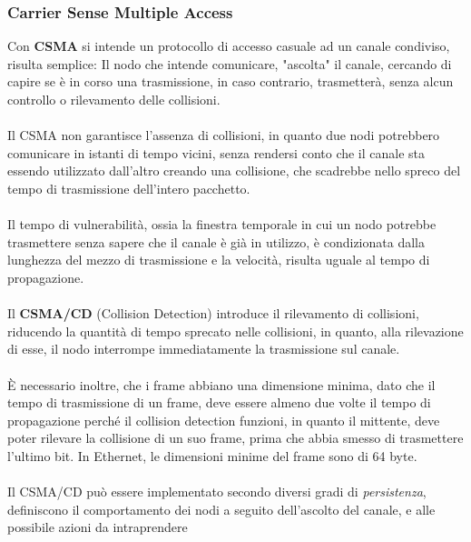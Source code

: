 \documentclass[12pt, letterpaper]{article}
\newcommand{\acc}{\\\hphantom{}\\}
\begin{document}
\subsubsection{Carrier Sense Multiple Access}\label{csma}
Con \textbf{CSMA} si intende un protocollo di accesso casuale ad un canale condiviso, risulta semplice: Il nodo che intende 
comunicare, "ascolta" il canale, cercando di capire se è in corso una trasmissione, in caso contrario, trasmetterà, senza 
alcun controllo o rilevamento delle collisioni.\acc 
Il CSMA non garantisce l'assenza di collisioni, in quanto due nodi potrebbero comunicare in istanti di tempo 
vicini, senza rendersi conto che il canale sta essendo utilizzato dall'altro creando una collisione, che scadrebbe nello 
spreco del tempo di trasmissione dell'intero pacchetto.\acc 
Il tempo di vulnerabilità, ossia la finestra temporale in cui un nodo potrebbe trasmettere senza sapere che il canale 
è già in utilizzo, è condizionata dalla lunghezza del mezzo di trasmissione e la velocità, risulta uguale 
al tempo di propagazione.\acc 
Il \textbf{CSMA/CD} (Collision Detection) introduce il rilevamento di collisioni, riducendo la quantità di tempo sprecato 
nelle collisioni, in quanto, alla rilevazione di esse, il nodo interrompe immediatamente la trasmissione sul canale.\acc 
È necessario inoltre, che i frame abbiano una dimensione minima, dato che il tempo di trasmissione di un frame, deve 
essere almeno due volte il tempo di propagazione perché il collision detection funzioni, in quanto il mittente, deve poter 
rilevare la collisione di un suo frame, prima che abbia smesso di trasmettere l'ultimo bit. In Ethernet, le dimensioni 
minime del frame sono di 64 byte.\acc Il CSMA/CD può essere implementato secondo diversi gradi di \textit{persistenza},
definiscono il comportamento dei nodi a seguito dell'ascolto del canale, e alle possibile azioni da intraprendere 
\end{document}
